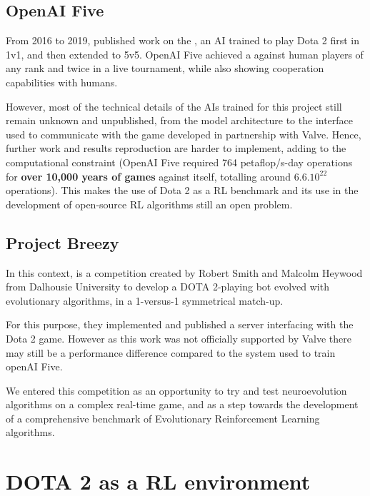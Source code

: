 \subsection{OpenAI Five}
From 2016 to 2019,  published work on the , an AI trained to play Dota 2 first in 1v1, and then extended to 5v5. OpenAI Five achieved a  against human players of any rank and  twice in a live tournament, while also showing cooperation capabilities with humans. 

However, most of the technical details of the AIs trained for this project still remain unknown and unpublished, from the model architecture to the interface used to communicate with the game developed in partnership with Valve. Hence, further work and results reproduction are harder to implement, adding to the computational constraint (OpenAI Five required 764 petaflop/s-day operations for \textbf{over 10,000 years of games} against itself, totalling around $6.6.10^{22}$ operations). This makes the use of Dota 2 as a RL benchmark and its use in the development of open-source RL algorithms still an open problem. 

\subsection{Project Breezy}

In this context,  is a competition created by Robert Smith and Malcolm Heywood from Dalhousie University to develop a DOTA 2-playing bot evolved with evolutionary algorithms, in a 1-versus-1 symmetrical match-up. 

For this purpose, they implemented and published a server interfacing with the Dota 2 game. However as this work was not officially supported by Valve there may still be a performance difference compared to the system used to train openAI Five.

We entered this competition as an opportunity to try and test neuroevolution algorithms on a complex real-time game, and as a step towards the development of a comprehensive benchmark of Evolutionary Reinforcement Learning algorithms.

\section{DOTA 2 as a RL environment}
